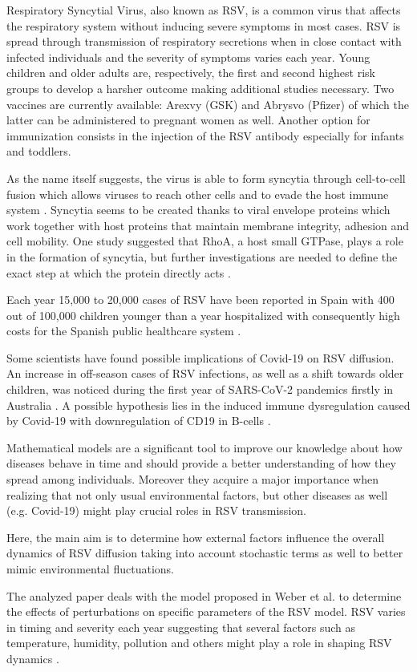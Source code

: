 Respiratory Syncytial Virus, also known as RSV, is a common virus that affects the respiratory system without inducing severe symptoms in most cases. RSV is spread through transmission of respiratory secretions when in close contact with infected individuals and the severity of symptoms varies each year. Young children and older adults are, respectively, the first and second highest risk groups to develop a harsher outcome making additional studies necessary. Two vaccines are currently available: Arexvy (GSK) and Abrysvo (Pfizer) of which the latter can be administered to pregnant women as well. Another option for immunization consists in the injection of the RSV antibody especially for infants and toddlers.\par
As the name itself suggests, the virus is able to form syncytia through cell-to-cell fusion which allows viruses to reach other cells and to evade the host immune system \cite{gower}. Syncytia seems to be created thanks to viral envelope proteins which work together with host proteins that maintain membrane integrity, adhesion and cell mobility. One study suggested that RhoA, a host small GTPase, plays a role in the formation of syncytia, but further investigations are needed to define the exact step at which the protein directly acts \cite{gower}.\par
Each year 15,000 to 20,000 cases of RSV have been reported in Spain with 400 out of 100,000 children younger than a year hospitalized with consequently high costs for the Spanish public healthcare system \cite{rsv}.\par
Some scientists have found possible implications of Covid-19 on RSV diffusion. An increase in off-season cases of RSV infections, as well as a shift towards older children, was noticed during the first year of SARS-CoV-2 pandemics firstly in Australia \cite{raya}. A possible hypothesis lies in the induced immune dysregulation caused by Covid-19 with downregulation of CD19 in B-cells \cite{jing}.\par
Mathematical models are a significant tool to improve our knowledge about how diseases behave in time and should provide a better understanding of how they spread among individuals. Moreover they acquire a major importance when realizing that not only usual environmental factors, but other diseases as well (e.g. Covid-19) might play crucial roles in RSV transmission.\par
Here, the main aim is to determine how external factors influence the overall dynamics of RSV diffusion taking into account stochastic terms as well to better mimic environmental fluctuations.\par
The analyzed paper deals with the model proposed in Weber et al. \cite{weber} to determine the effects of perturbations on specific parameters of the RSV model. RSV varies in timing and severity each year suggesting that several factors such as temperature, humidity, pollution and others might play a role in shaping RSV dynamics \cite{weber}.